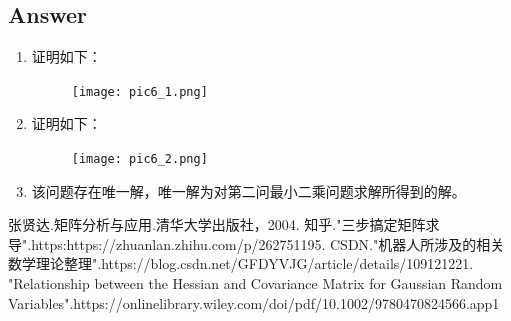 \documentclass[
	12pt, %
]{fphw} %
\begin{document}

\subsection*{Answer}

\begin{enumerate}
	\item 证明如下：
	\begin{figure}[H]
		\centering
		\texttt{[image: pic6\_1.png]} 
	\end{figure}
	\item 证明如下：
	\begin{figure}[H]
		\centering
		\texttt{[image: pic6\_2.png]} 
	\end{figure}
	\item 该问题存在唯一解，唯一解为对第二问最小二乘问题求解所得到的解。
\end{enumerate}


%
\begin{thebibliography}{99}    %
	张贤达.矩阵分析与应用.清华大学出版社，2004.                    %
	知乎."三步搞定矩阵求导".https:https://zhuanlan.zhihu.com/p/262751195.         %
	CSDN."机器人所涉及的相关数学理论整理".https://blog.csdn.net/GFDYVJG/article/details/109121221.
	"Relationship between the Hessian and Covariance Matrix for Gaussian Random Variables".https://onlinelibrary.wiley.com/doi/pdf/10.1002/9780470824566.app1
\end{thebibliography}
\end{document}
